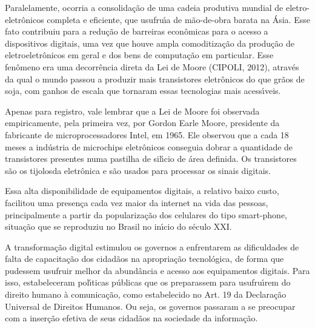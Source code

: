 \documentclass[
12pt,		%
openright,	%
twoside,  %
a4paper,			%
chapter=TITLE,		%
english,			%
french,				%
spanish,			%
brazil				%
]{USPSC-classe/USPSC}
\begin{document}
Paralelamente, ocorria a consolida\c{c}\~ao de uma cadeia produtiva mundial de eletro-eletr\^onicos completa e eficiente, que usufru\'{\i}a de m\~ao-de-obra barata na \'Asia. Esse fato contribuiu para a redu\c{c}\~ao de barreiras econ\^omicas para o acesso a dispositivos digitais, uma vez que houve ampla comoditiza\c{c}\~ao da produ\c{c}\~ao de eletroeletr\^onicos em geral e dos bens de computa\c{c}\~ao em particular. Esse fen\^omeno era uma decorr\^encia direta da Lei de Moore (CIPOLI, 2012), atrav\'es da qual o mundo passou a produzir mais transistores eletr\^onicos do que gr\~aos de soja, com ganhos de escala que tornaram essas tecnologias mais acess\'{\i}veis.










Apenas para registro, vale lembrar que a Lei de Moore foi observada empiricamente, pela primeira vez, por Gordon Earle Moore, presidente da fabricante de microprocessadores Intel, em 1965. Ele observou que a cada 18 meses a ind\'ustria de microchips eletr\^onicos conseguia dobrar a quantidade de transistores presentes numa pastilha de sil\'{\i}cio de \'area definida. Os transistores s\~ao os \textquotedbl tijolos\textquotedbl  da eletr\^onica e s\~ao usados para processar os sinais digitais.










Essa alta disponibilidade de equipamentos digitais, a relativo baixo custo, facilitou uma presen\c{c}a cada vez maior da internet na vida das pessoas, principalmente a partir da populariza\c{c}\~ao dos celulares do tipo \textquotedbl smart-phone\textquotedbl , situa\c{c}\~ao que se reproduziu no Brasil no in\'{\i}cio do s\'eculo XXI.










A transforma\c{c}\~ao digital estimulou os governos a enfrentarem as dificuldades  de falta de  capacita\c{c}\~ao dos cidad\~aos na apropria\c{c}\~ao tecnol\'ogica, de forma que pudessem usufruir melhor da abund\^ancia e acesso aos equipamentos digitais. Para isso, estabeleceram pol\'{\i}ticas p\'ublicas que os preparassem para usufru\'{\i}rem do direito humano \`a comunica\c{c}\~ao, como estabelecido no Art. 19 da Declara\c{c}\~ao Universal de Direitos Humanos. Ou seja, os governos passaram a se preocupar com a inser\c{c}\~ao efetiva de seus cidad\~aos na sociedade da informa\c{c}\~ao.
\end{document}
